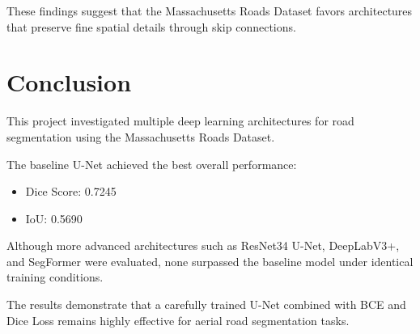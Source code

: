 \documentclass[12pt]{article}
\begin{document}
These findings suggest that the Massachusetts Roads Dataset favors architectures that preserve fine spatial details through skip connections.

\section{Conclusion}

This project investigated multiple deep learning architectures for road segmentation using the Massachusetts Roads Dataset.

The baseline U-Net achieved the best overall performance:

\begin{itemize}
\item Dice Score: 0.7245
\item IoU: 0.5690
\end{itemize}

Although more advanced architectures such as ResNet34 U-Net, DeepLabV3+, and SegFormer were evaluated, none surpassed the baseline model under identical training conditions.

The results demonstrate that a carefully trained U-Net combined with BCE and Dice Loss remains highly effective for aerial road segmentation tasks.
\end{document}
